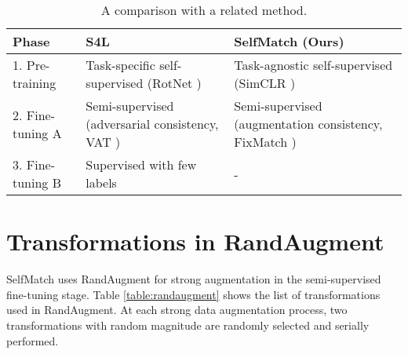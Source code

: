 \documentclass{article}
\begin{document}
\begin{table}[h]
  \caption{A comparison with a related method.}
  \label{table:comparison-with-related-method}

  \centering
  \begin{tabular}{m{2.5cm} m{4.0cm} m{4.5cm}}
    \toprule
    \textbf{Phase} & \textbf{S4L} \cite{zhai2019s4l} & \textbf{SelfMatch} (Ours) \\
    
    \hline
    \noalign{\smallskip}
    1. Pre-training & Task-specific self-supervised (RotNet \cite{gidaris2018unsupervised}) & Task-agnostic self-supervised (SimCLR \cite{chen2020simple}) \\
    
    \hline
    \noalign{\smallskip}
    2. Fine-tuning A & Semi-supervised (adversarial consistency, VAT \cite{miyato2018virtual}) & Semi-supervised (augmentation consistency, FixMatch \cite{sohn2020fixmatch}) \\
    
    \hline
    \noalign{\smallskip}
    3. Fine-tuning B & Supervised with few labels & - \\
    \bottomrule
  \end{tabular}
\end{table} \section{Transformations in RandAugment}
\label{app:randaugment}

SelfMatch uses RandAugment \cite{cubuk2020randaugment} for strong augmentation in the semi-supervised fine-tuning stage. Table \ref{table:randaugment} shows the list of transformations used in RandAugment. At each strong data augmentation process, two transformations with random magnitude are randomly selected and serially performed.
\end{document}
